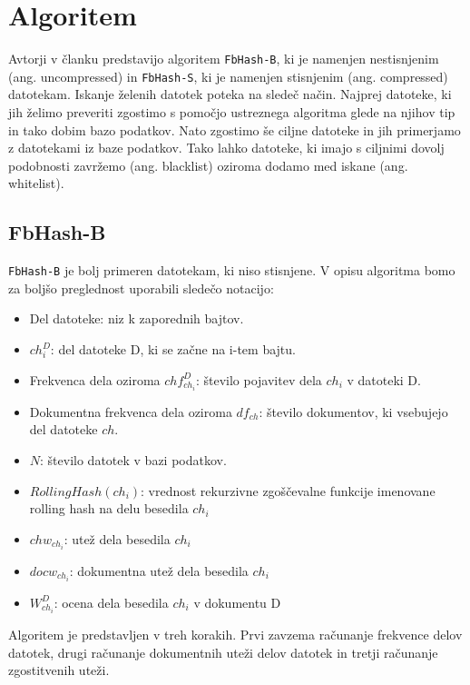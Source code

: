 \documentclass{acm_proc_article-sp}
\begin{document}
\section{Algoritem}

Avtorji v članku \cite{fbhash} predstavijo algoritem \texttt{FbHash-B}, ki je namenjen nestisnjenim (ang. uncompressed) in \texttt{FbHash-S}, ki je namenjen stisnjenim (ang. compressed) datotekam. Iskanje želenih datotek poteka na sledeč način. Najprej datoteke, ki jih želimo preveriti zgostimo s pomočjo ustreznega algoritma glede na njihov tip in tako dobim bazo podatkov. Nato zgostimo še ciljne datoteke in jih primerjamo z datotekami iz baze podatkov. Tako lahko datoteke, ki imajo s ciljnimi dovolj podobnosti zavržemo (ang. blacklist) oziroma dodamo med iskane (ang. whitelist).

\subsection{FbHash-B}

\texttt{FbHash-B} je bolj primeren datotekam, ki niso stisnjene. V opisu algoritma bomo za boljšo preglednost uporabili sledečo notacijo:
\begin{itemize}
  \item Del datoteke: niz k zaporednih bajtov. 
  \item $ch_{i}^D$: del datoteke D, ki se začne na i-tem bajtu.
  \item Frekvenca dela oziroma $chf_{ch_i}^D$: število pojavitev dela $ch_i$ v datoteki D.
  \item Dokumentna frekvenca dela oziroma $df_{ch}$: število dokumentov, ki vsebujejo del datoteke $ch$.
  \item $N$: število datotek v bazi podatkov.
  \item $RollingHash(ch_i)$: vrednost rekurzivne zgoščevalne funkcije imenovane rolling hash na delu besedila $ch_i$
  \item $chw_{ch_i}$: utež dela besedila $ch_i$
  \item $docw_{ch_i}$: dokumentna utež dela besedila $ch_i$
  \item $W_{ch_i}^D$: ocena dela besedila $ch_i$ v dokumentu D
\end{itemize}

Algoritem je predstavljen v treh korakih. Prvi zavzema računanje frekvence delov datotek, drugi računanje dokumentnih uteži delov datotek in tretji računanje zgostitvenih uteži.
\end{document}
